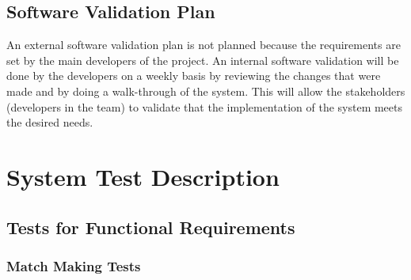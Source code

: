 \documentclass[12pt, titlepage]{article}
\begin{document}

\subsection{Software Validation Plan}

An external software validation plan is not planned because the requirements are set by the main developers of the project. An internal software validation will be done by the developers on a weekly basis by reviewing the changes that were made and by doing a walk-through of the system. This will allow the stakeholders (developers in the team) to validate that the implementation of the system meets the desired needs.


\section{System Test Description}
	
\subsection{Tests for Functional Requirements}



\subsubsection{Match Making Tests}

		
\paragraph{}
\end{document}

